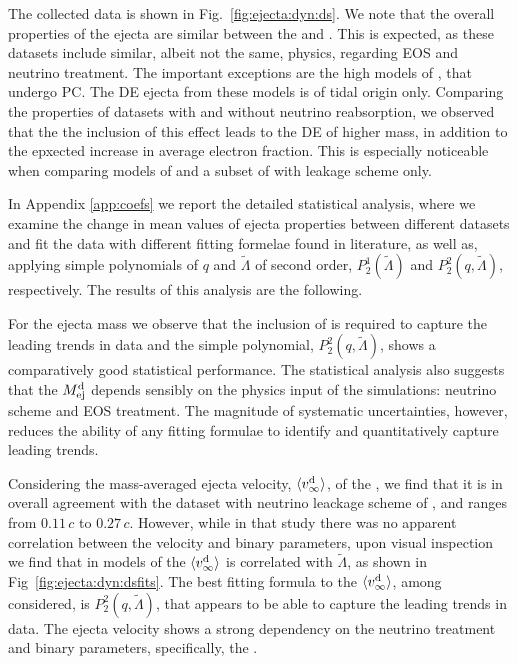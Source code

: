 The collected data is shown in Fig.~\ref{fig:ejecta:dyn:ds}. We note that the overall properties of the 
ejecta are similar between the \DSrefset{} and \DSheatcool{}. This is expected, as these 
datasets include similar, albeit not the same, physics, regarding \ac{EOS} and neutrino treatment.
%
The important exceptions are the high \mr{} models of \DSrefset{}, 
that undergo \ac{PC}. The \ac{DE} ejecta from these models is of tidal origin only. 
%
Comparing the properties of datasets with and without neutrino reabsorption, we observed 
that the the inclusion of this effect leads to the \ac{DE} of higher mass, in addition to 
the epxected increase in average electron fraction. This is especially noticeable when 
comparing models of \DSrefset{} and a subset of \citet{Radice:2018pdn} with leakage scheme only.


In Appendix \ref{app:coefs} we report the detailed statistical analysis, where we examine the 
change in mean values of ejecta properties between different datasets and fit the 
data with different fitting formelae found in literature, as well as, applying simple 
polynomials of $q$ and $\tilde{\Lambda}$ of second order,
$P_2^1(\tilde{\Lambda})$ and $P_2^2(q,\tilde{\Lambda})$, respectively. 
The results of this analysis are the following. 

For the ejecta mass we observe that the inclusion of \mr{} is required 
to capture the leading trends in data and the simple polynomial, 
$P_2^2(q,\tilde{\Lambda})$, shows a comparatively good statistical performance.
%
The statistical analysis also suggests that the $M^{\text{d}}_{\text{ej}}$ depends 
sensibly on the physics input of the simulations: neutrino scheme and \ac{EOS} treatment.
%
The magnitude of systematic uncertainties, however, reduces the ability of any 
fitting formulae to identify and quantitatively capture leading trends.
%

Considering the mass-averaged ejecta velocity, $\langle v^{\text{d}}_\infty\rangle$, of the \DSrefset{}, we 
find that it is in overall agreement with the dataset with neutrino leackage scheme 
of \citet{Radice:2018pdn}, and ranges from $0.11\, c$ to $0.27\, c$. However, while in 
that study there was no apparent correlation between the velocity and binary 
parameters, upon visual inspection we find that in models of \DSrefset{} the $\langle v^{\text{d}}_\infty\rangle$ 
is correlated with $\tilde{\Lambda}$, as shown in Fig~\ref{fig:ejecta:dyn:dsfits}.
%
The best fitting formula to the $\langle v^{\text{d}}_\infty\rangle$, among considered, is $P_2^2(q,\tilde\Lambda)$, 
that appears to be able to capture the leading trends in data. 
%
The ejecta velocity shows a strong dependency on the neutrino treatment 
and binary parameters, specifically, the \mr{}.

